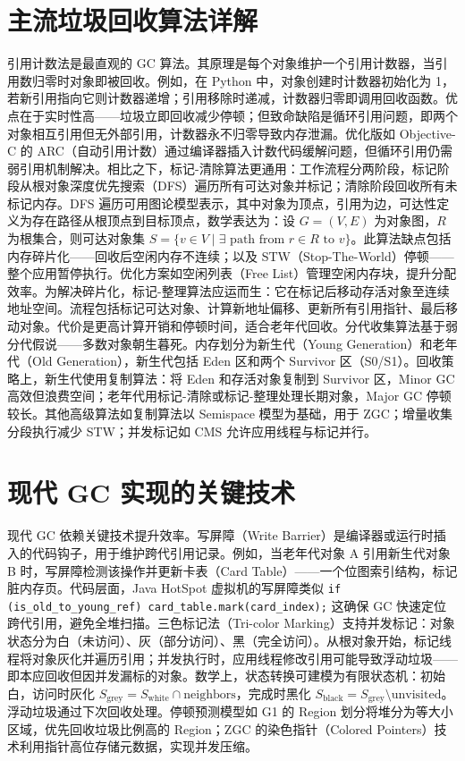 \chapter{主流垃圾回收算法详解}
引用计数法是最直观的 GC 算法。其原理是每个对象维护一个引用计数器，当引用数归零时对象即被回收。例如，在 Python 中，对象创建时计数器初始化为 1，若新引用指向它则计数器递增；引用移除时递减，计数器归零即调用回收函数。优点在于实时性高——垃圾立即回收减少停顿；但致命缺陷是循环引用问题，即两个对象相互引用但无外部引用，计数器永不归零导致内存泄漏。优化版如 Objective-C 的 ARC（自动引用计数）通过编译器插入计数代码缓解问题，但循环引用仍需弱引用机制解决。相比之下，标记-清除算法更通用：工作流程分两阶段，标记阶段从根对象深度优先搜索（DFS）遍历所有可达对象并标记；清除阶段回收所有未标记内存。DFS 遍历可用图论模型表示，其中对象为顶点，引用为边，可达性定义为存在路径从根顶点到目标顶点，数学表达为：设 $G = (V, E)$ 为对象图，$R$ 为根集合，则可达对象集 $S = \{ v \in V \mid \exists \text{ path from } r \in R \text{ to } v \}$。此算法缺点包括内存碎片化——回收后空闲内存不连续；以及 STW（Stop-The-World）停顿——整个应用暂停执行。优化方案如空闲列表（Free List）管理空闲内存块，提升分配效率。为解决碎片化，标记-整理算法应运而生：它在标记后移动存活对象至连续地址空间。流程包括标记可达对象、计算新地址偏移、更新所有引用指针、最后移动对象。代价是更高计算开销和停顿时间，适合老年代回收。分代收集算法基于弱分代假说——多数对象朝生暮死。内存划分为新生代（Young Generation）和老年代（Old Generation），新生代包括 Eden 区和两个 Survivor 区（S0/S1）。回收策略上，新生代使用复制算法：将 Eden 和存活对象复制到 Survivor 区，Minor GC 高效但浪费空间；老年代用标记-清除或标记-整理处理长期对象，Major GC 停顿较长。其他高级算法如复制算法以 Semispace 模型为基础，用于 ZGC；增量收集分段执行减少 STW；并发标记如 CMS 允许应用线程与标记并行。\par
\chapter{现代 GC 实现的关键技术}
现代 GC 依赖关键技术提升效率。写屏障（Write Barrier）是编译器或运行时插入的代码钩子，用于维护跨代引用记录。例如，当老年代对象 A 引用新生代对象 B 时，写屏障检测该操作并更新卡表（Card Table）——一个位图索引结构，标记脏内存页。代码层面，Java HotSpot 虚拟机的写屏障类似 \texttt{if (is\_{}old\_{}to\_{}young\_{}ref) card\_{}table.mark(card\_{}index);} 这确保 GC 快速定位跨代引用，避免全堆扫描。三色标记法（Tri-color Marking）支持并发标记：对象状态分为白（未访问）、灰（部分访问）、黑（完全访问）。从根对象开始，标记线程将对象灰化并遍历引用；并发执行时，应用线程修改引用可能导致浮动垃圾——即本应回收但因并发漏标的对象。数学上，状态转换可建模为有限状态机：初始白，访问时灰化 $S_{\text{grey}} = S_{\text{white}} \cap \text{neighbors}$，完成时黑化 $S_{\text{black}} = S_{\text{grey}} \setminus \text{unvisited}$。浮动垃圾通过下次回收处理。停顿预测模型如 G1 的 Region 划分将堆分为等大小区域，优先回收垃圾比例高的 Region；ZGC 的染色指针（Colored Pointers）技术利用指针高位存储元数据，实现并发压缩。\par
